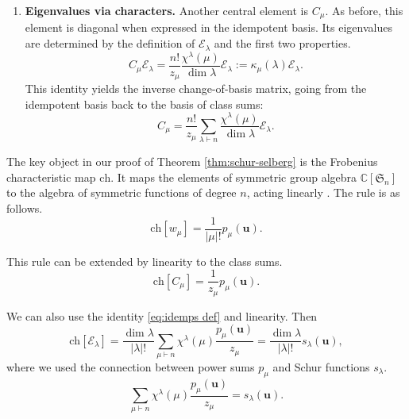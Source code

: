 \documentclass{article}
\theoremstyle{plain}
\theoremstyle{definition}
\numberwithin{equation}{section}
\begin{document}
\begin{enumerate}
    
    \item \textbf{Eigenvalues via characters.}
    Another central element is $C_\mu$. As before, this element is diagonal when expressed in the idempotent basis. Its eigenvalues are determined by the definition of $\mathcal{E}_\lambda$ and the first two properties.
    \begin{equation}
        \label{eq:Cmu idemps}
        C_\mu \mathcal{E}_\lambda = \frac{n!}{z_\mu} \frac{\chi^\lambda(\mu)}{\dim \lambda} \mathcal{E}_\lambda := \kappa_\mu(\lambda) \mathcal{E}_\lambda.
    \end{equation}
    This identity yields the inverse change-of-basis matrix, going from the idempotent basis back to the basis of class sums:
    \begin{equation}
        \label{eq:idemps to Cmu}
        C_\mu = \frac{n!}{z_\mu} \sum_{\lambda \vdash n} \frac{\chi^\lambda(\mu)}{\dim \lambda} \mathcal{E}_\lambda.
    \end{equation}

\end{enumerate}

The key object in our proof of Theorem \ref{thm:schur-selberg} is the Frobenius characteristic map $\mathrm{ch}$. It maps the elements of symmetric group algebra $\mathbb{C}[\mathfrak{S}_n]$ to the algebra of symmetric functions of degree $n$, acting linearly \cite[Chapter I, §7]{macdonald1995symmetric}. The rule is as follows.
\begin{equation}
    \label{eq:def Frobenius map}
    \mathrm{ch}[w_{\mu}] = \frac{1}{|\mu|!}p_{\mu}(\mathbf{u}).
\end{equation}

This rule can be extended by linearity to the class sums.
\begin{equation}
    \label{eq:Frobenius map cmu}
    \mathrm{ch}[C_{\mu}] = \frac{1}{z_{\mu}}p_{\mu}(\mathbf{u}).
\end{equation}

We can also use the identity \eqref{eq:idemps def} and linearity. Then
\begin{equation}
    \label{eq:Frobenius map idemps}
    \mathrm{ch}[\mathcal{E}_{\lambda}] = \frac{\dim \lambda }{|\lambda|!} \sum_{\mu \vdash n} \chi^\lambda(\mu) \frac{p_{\mu}(\mathbf{u})}{z_\mu} = \frac{\dim \lambda }{|\lambda|!} s_{\lambda}(\mathbf{u}),
\end{equation}
where we used the connection between power sums $p_\mu$ and Schur functions $s_\lambda$.  
\begin{equation}
\label{eq:p-s-connection}
    \sum_{\mu \vdash n} \chi^\lambda(\mu) \frac{p_{\mu}(\mathbf{u})}{z_\mu} =  s_{\lambda}(\mathbf{u}).
\end{equation}
\end{document}
